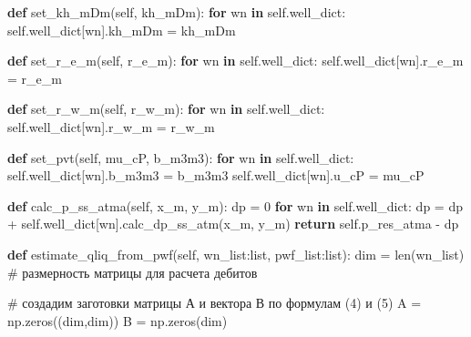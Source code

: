 \documentclass[
  russian,
  letterpaper,
  DIV=11,
  numbers=noendperiod,
  oneside]{scrartcl}
\newenvironment{Shaded}{\begin{snugshade}}{\end{snugshade}}
\newcommand{\BuiltInTok}[1]{\textcolor[rgb]{0.00,0.23,0.31}{#1}}
\newcommand{\CommentTok}[1]{\textcolor[rgb]{0.37,0.37,0.37}{#1}}
\newcommand{\ControlFlowTok}[1]{\textcolor[rgb]{0.00,0.23,0.31}{\textbf{#1}}}
\newcommand{\DecValTok}[1]{\textcolor[rgb]{0.68,0.00,0.00}{#1}}
\newcommand{\KeywordTok}[1]{\textcolor[rgb]{0.00,0.23,0.31}{\textbf{#1}}}
\newcommand{\NormalTok}[1]{\textcolor[rgb]{0.00,0.23,0.31}{#1}}
\newcommand{\OperatorTok}[1]{\textcolor[rgb]{0.37,0.37,0.37}{#1}}
\newcommand{\VariableTok}[1]{\textcolor[rgb]{0.07,0.07,0.07}{#1}}
\begin{document}
\begin{Shaded}
\begin{Highlighting}[]
    \KeywordTok{def}\NormalTok{ set\_kh\_mDm(}\VariableTok{self}\NormalTok{, kh\_mDm):}
        \ControlFlowTok{for}\NormalTok{ wn }\KeywordTok{in} \VariableTok{self}\NormalTok{.well\_dict:}
            \VariableTok{self}\NormalTok{.well\_dict[wn].kh\_mDm }\OperatorTok{=}\NormalTok{ kh\_mDm}

    \KeywordTok{def}\NormalTok{ set\_r\_e\_m(}\VariableTok{self}\NormalTok{, r\_e\_m):}
        \ControlFlowTok{for}\NormalTok{ wn }\KeywordTok{in} \VariableTok{self}\NormalTok{.well\_dict:}
            \VariableTok{self}\NormalTok{.well\_dict[wn].r\_e\_m }\OperatorTok{=}\NormalTok{ r\_e\_m}
    
    \KeywordTok{def}\NormalTok{ set\_r\_w\_m(}\VariableTok{self}\NormalTok{, r\_w\_m):}
        \ControlFlowTok{for}\NormalTok{ wn }\KeywordTok{in} \VariableTok{self}\NormalTok{.well\_dict:}
            \VariableTok{self}\NormalTok{.well\_dict[wn].r\_w\_m }\OperatorTok{=}\NormalTok{ r\_w\_m}

    \KeywordTok{def}\NormalTok{ set\_pvt(}\VariableTok{self}\NormalTok{, mu\_cP, b\_m3m3):}
        \ControlFlowTok{for}\NormalTok{ wn }\KeywordTok{in} \VariableTok{self}\NormalTok{.well\_dict:}
            \VariableTok{self}\NormalTok{.well\_dict[wn].b\_m3m3 }\OperatorTok{=}\NormalTok{ b\_m3m3}
            \VariableTok{self}\NormalTok{.well\_dict[wn].u\_cP }\OperatorTok{=}\NormalTok{ mu\_cP}

    \KeywordTok{def}\NormalTok{ calc\_p\_ss\_atma(}\VariableTok{self}\NormalTok{, x\_m, y\_m):}
\NormalTok{        dp }\OperatorTok{=} \DecValTok{0}
        \ControlFlowTok{for}\NormalTok{ wn }\KeywordTok{in} \VariableTok{self}\NormalTok{.well\_dict:}
\NormalTok{            dp }\OperatorTok{=}\NormalTok{ dp }\OperatorTok{+} \VariableTok{self}\NormalTok{.well\_dict[wn].calc\_dp\_ss\_atm(x\_m, y\_m)}
        \ControlFlowTok{return} \VariableTok{self}\NormalTok{.p\_res\_atma }\OperatorTok{{-}}\NormalTok{ dp}

    \KeywordTok{def}\NormalTok{ estimate\_qliq\_from\_pwf(}\VariableTok{self}\NormalTok{, wn\_list:}\BuiltInTok{list}\NormalTok{, pwf\_list:}\BuiltInTok{list}\NormalTok{):}
\NormalTok{        dim }\OperatorTok{=} \BuiltInTok{len}\NormalTok{(wn\_list)  }\CommentTok{\# размерность матрицы для расчета дебитов}

        \CommentTok{\# создадим заготовки матрицы А и вектора В по формулам (4) и (5)}
\NormalTok{        A }\OperatorTok{=}\NormalTok{ np.zeros((dim,dim))}
\NormalTok{        B }\OperatorTok{=}\NormalTok{ np.zeros(dim)}


\end{Highlighting}
\end{Shaded}
\end{document}
